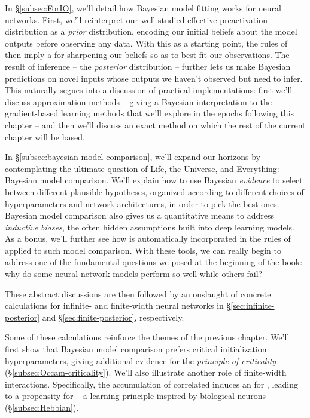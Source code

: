 In \S\ref{subsec:ForIO}, we'll detail how Bayesian model fitting works for neural networks.
First, we'll reinterpret our well-studied effective preactivation distribution as a \emph{prior} distribution, encoding our initial beliefs about the model outputs before observing any data.
With this as a starting point, the rules of  then imply a  for sharpening our beliefs
so as to best fit our
observations.
The result of inference -- the \emph{posterior} distribution -- further lets us make Bayesian predictions
on novel inputs whose outputs we haven't observed but need to infer.
This naturally segues into a discussion of practical implementations: first we'll discuss approximation methods -- giving a Bayesian
interpretation to the gradient-based learning methods that we'll explore in the epochs following this chapter
-- and then we'll discuss an exact method on which the rest of the current chapter will be based.



In \S\ref{subsec:bayesian-model-comparison}, we'll expand our horizons by contemplating 
the ultimate question of
Life, the Universe, and Everything: Bayesian model comparison. 
We'll explain how to use Bayesian \emph{evidence} to select between different plausible hypotheses, organized according to different choices of hyperparameters and network architectures, in order to pick the best ones.
Bayesian model comparison also gives us a quantitative means to address \emph{inductive biases}, the often hidden assumptions built into deep learning models. As a bonus, we'll further see how  is automatically incorporated in the rules of  applied to such model comparison.
With these tools, we can really begin to address one of the fundamental questions we posed at the beginning of the book:
why do some neural network models perform so well while others fail?

These abstract discussions are then followed by an onslaught of concrete calculations for infinite- and finite-width neural networks in \S\ref{sec:infinite-posterior} and \S\ref{sec:finite-posterior}, respectively.

Some of these calculations reinforce the themes of the previous chapter.
We'll first show that Bayesian model comparison prefers critical initialization hyperparameters, giving additional evidence for the \emph{principle of criticality} (\S\ref{subsec:Occam-criticality}). 
We'll also illustrate another role of finite-width interactions. Specifically, the accumulation of correlated  induces an  for , leading to a propensity for  -- a learning principle inspired by biological neurons (\S\ref{subsec:Hebbian}).


